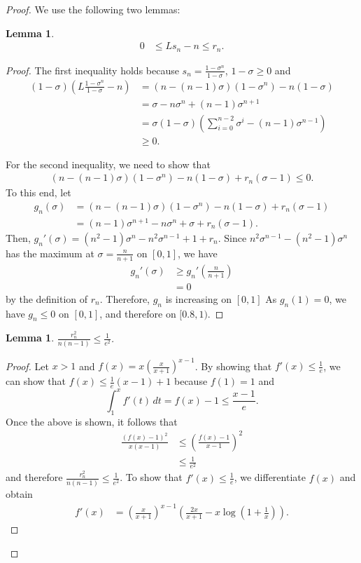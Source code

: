 \documentclass{article}
\theoremstyle{plain}
\newtheorem{lemma}[theorem]{Lemma}
\theoremstyle{definition}
\theoremstyle{remark}
\def\bigopen#1{\left(#1\right)}
\begin{document}
\begin{proof}
We use the following two lemmas:
\begin{lemma}
\label{lem:gammaub1}
\begin{align*}
    0 &\le Ls_n - n \le r_n.
\end{align*}
\end{lemma}
\begin{proof}
The first inequality holds because $s_n=\frac{1-\sigma^n}{1-\sigma}$, $1-\sigma \ge 0$ and 
\begin{align*}
    (1-\sigma)\bigopen{L \frac{1-\sigma^n}{1-\sigma} - n} &= (n-(n-1)\sigma)(1-\sigma^n)-n(1-\sigma) \\
    &= \sigma - n\sigma^n + (n-1)\sigma^{n+1} \\
    &= \sigma (1-\sigma) \bigopen{\sum_{i=0}^{n-2}\sigma^i-(n-1)\sigma^{n-1}} \\
    &\ge 0.
\end{align*}

For the second inequality, we need to show that 
\begin{align*}
    (n-(n-1)\sigma)(1-\sigma^n) - n(1-\sigma) + r_n (\sigma-1) \le 0.
\end{align*}
To this end, let 
\begin{align*}
    g_n(\sigma) &= (n-(n-1)\sigma)(1-\sigma^n) - n(1-\sigma) + r_n (\sigma-1) \\
    &= (n-1)\sigma^{n+1} - n\sigma^n + \sigma + r_n(\sigma-1).
\end{align*} Then, $g_n'(\sigma)=(n^2 - 1) \sigma^n - n^2 \sigma^{n-1} + 1 + r_n$. Since $n^2 \sigma^{n-1} - (n^2-1) \sigma^n$ has the maximum at $\sigma=\frac{n}{n+1}$ on $[0, 1]$, we have 
\begin{align*}
    g_n'(\sigma) &\ge g_n' \bigopen{\frac{n}{n+1}}\\
    &= 0
\end{align*}
by the definition of $r_n$. Therefore, $g_n$ is increasing on $[0, 1]$ As $g_n(1)=0$, we have $g_n\le 0$ on $[0,1]$, and therefore on $[0.8, 1)$.
\end{proof}

\begin{lemma}
$\frac{r_n^2}{n(n-1)}\le \frac{1}{e^2}$.
\end{lemma}
\begin{proof}
Let $x>1$ and $f(x)=x\bigopen{ \frac{x}{x+1} }^{x-1}$. By showing that $f'(x)\le \frac{1}{e}$, we can show that $f(x)\le \frac{1}{e}(x-1)+1$ because $f(1)=1$ and \[
\int_1^x f'(t)\, dt = f(x)-1 \le \frac{x-1}{e}. 
\]
Once the above is shown, it follows that 
\begin{align*}
    \frac{(f(x)-1)^2}{x(x-1)} &\le \bigopen{ \frac{f(x)-1}{x-1} }^2 \\
    & \le \frac{1}{e^2}
\end{align*}
and therefore $\frac{r_n^2}{n(n-1)}\le \frac{1}{e^2}$. To show that $f'(x)\le \frac{1}{e}$, we differentiate $f(x)$ and obtain 
\begin{align*}
    f'(x) &= \bigopen{ \frac{x}{x+1} }^{x-1} \bigopen{ \frac{2x}{x+1} - x\log\bigopen{ 1+\frac{1}{x} } }. 
\end{align*}


\end{proof}
\end{proof}
\end{document}
